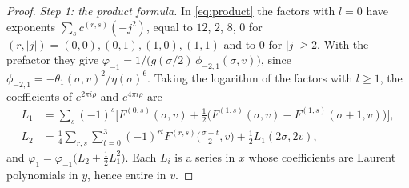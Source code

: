 \begin{proof}
\emph{Step 1: the product formula.} In \eqref{eq:product} the factors with $l=0$ have exponents $\sum_sc^{(r,s)}(-j^2)$, equal to $12$, $2$, $8$, $0$ for $(r,|j|)=(0,0),(0,1),(1,0),(1,1)$ and to $0$ for $|j|\ge2$. With the prefactor they give $\varphi_{-1}=1/\big(g(\sigma/2)\,\phi_{-2,1}(\sigma,v)\big)$, since $\phi_{-2,1}=-\theta_1(\sigma,v)^2/\eta(\sigma)^6$. Taking the logarithm of the factors with $l\ge1$, the coefficients of $e^{2\pi i\rho}$ and $e^{4\pi i\rho}$ are
\[
\begin{aligned}
L_1&=\sum_s(-1)^s\Big[F^{(0,s)}(\sigma,v)+\tfrac12\big(F^{(1,s)}(\sigma,v)-F^{(1,s)}(\sigma+1,v)\big)\Big],\\
L_2&=\tfrac14\sum_{r,s}\sum_{t=0}^3(-1)^{rt}F^{(r,s)}\big(\tfrac{\sigma+t}2,v\big)+\tfrac12L_1(2\sigma,2v),
\end{aligned}
\]
and $\varphi_1=\varphi_{-1}\big(L_2+\tfrac12L_1^2\big)$. Each $L_i$ is a series in $x$ whose coefficients are Laurent polynomials in $y$, hence entire in $v$.


\end{proof}
